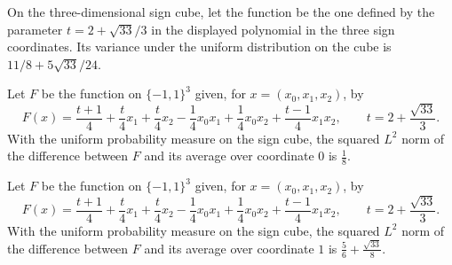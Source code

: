 \begin{theorem}
\label{FABL.productVariance_osssCounterexample}
\leanok
{}
On the three-dimensional sign cube, let the function be the one defined by the parameter
$t=2+\sqrt{33}/3$ in the displayed polynomial in the three sign coordinates. Its
variance under the uniform distribution on the cube is $11/8+5\sqrt{33}/24$.
\end{theorem}

\begin{theorem}
\label{FABL.productInfluence_osssCounterexample_zero}
\leanok
{}
Let $F$ be the function on $\{-1,1\}^3$ given, for $x=(x_0,x_1,x_2)$, by
\[
F(x)=\frac{t+1}{4}+\frac{t}{4}x_1+\frac{t}{4}x_2-\frac14x_0x_1+\frac14x_0x_2+\frac{t-1}{4}x_1x_2,
\qquad t=2+\frac{\sqrt{33}}{3}.
\]
With the uniform probability measure on the sign cube, the squared $L^2$ norm of the
difference between $F$ and its average over coordinate $0$ is $\frac18$.
\end{theorem}

\begin{theorem}
\label{FABL.productInfluence_osssCounterexample_one}
\leanok
{}
Let $F$ be the function on $\{-1,1\}^3$ given, for $x=(x_0,x_1,x_2)$, by
\[
F(x)=\frac{t+1}{4}+\frac{t}{4}x_1+\frac{t}{4}x_2-\frac14x_0x_1+\frac14x_0x_2+\frac{t-1}{4}x_1x_2,
\qquad t=2+\frac{\sqrt{33}}{3}.
\]
With the uniform probability measure on the sign cube, the squared $L^2$ norm of the
difference between $F$ and its average over coordinate $1$ is
$\frac56+\frac{\sqrt{33}}8$.
\end{theorem}

